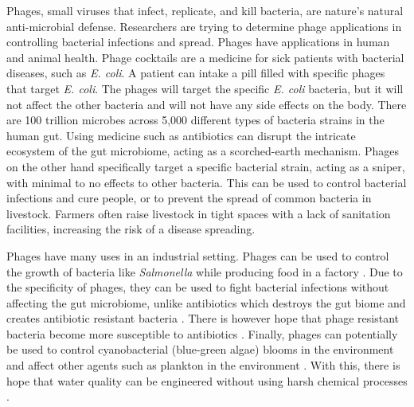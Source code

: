 Phages, small viruses that infect, replicate, and kill bacteria, are nature's natural anti-microbial defense. 
Researchers are trying to determine phage applications in controlling bacterial infections and spread. 
Phages have applications in human and animal health. 
Phage cocktails are a medicine for sick patients with bacterial diseases, such as \textit{E. coli}. 
A patient can intake a pill filled with specific phages that target \textit{E. coli}.
The phages will target the specific \textit{E. coli} bacteria, but it will not affect the other bacteria and will not have any side effects on the body. 
There are 100 trillion microbes across 5,000 different types of bacteria strains in the human gut. 
Using medicine such as antibiotics can disrupt the intricate ecosystem of the gut microbiome, acting as a scorched-earth mechanism. 
Phages on the other hand specifically target a specific bacterial strain, acting as a sniper, with minimal to no effects to other bacteria. 
This can be used to control bacterial infections and cure people, or to prevent the spread of common bacteria in livestock. 
Farmers often raise livestock in tight spaces with a lack of sanitation facilities, increasing the risk of a disease spreading. \newline 

Phages have many uses in an industrial setting. 
Phages can be used to control the growth of bacteria like \textit{Salmonella} while producing food in a factory \cite{sofferBacteriophagesSafelyReduce2016, kowalskaFreshVegetablesFruit2023}. 
Due to the specificity of phages, they can be used to fight bacterial infections without affecting the gut microbiome, unlike antibiotics which destroys the gut biome and creates antibiotic resistant bacteria \cite{odonkorBacteriaResistanceAntibiotics2011, volkovaEffectsEarlylifePenicillin2021}. 
There is however hope that phage resistant bacteria become more susceptible to antibiotics \cite{laurePhageResistancemediatedTradeoffs2022, zhaoPhagedrivenCoevolutionReveals2024}. 
Finally, phages can potentially be used to control cyanobacterial (blue-green algae) blooms in the environment and affect other agents such as plankton in the environment \cite{colomaFrequencyVirusresistantHosts2019}. 
With this, there is hope that water quality can be engineered without using harsh chemical processes \cite{tuckerIdentificationCyanophageMaLBP2005}. \newline

